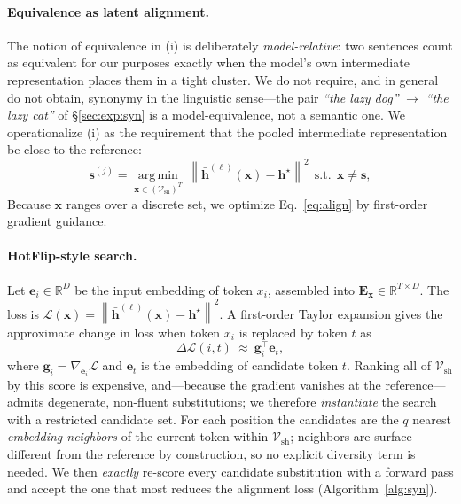 \documentclass[11pt]{article}
\newcommand{\R}{\mathbb{R}}
\newcommand{\Vsh}{\mathcal{V}_{\mathrm{sh}}}
\newcommand{\norm}[1]{\left\lVert #1 \right\rVert}
\newcommand{\argmin}{\operatorname*{arg\,min}}
\theoremstyle{definition}
\begin{document}
\paragraph{Equivalence as latent alignment.}
The notion of equivalence in (i) is deliberately \emph{model-relative}: two
sentences count as equivalent for our purposes exactly when the model's own
intermediate representation places them in a tight cluster. We do not require,
and in general do not obtain, synonymy in the linguistic sense---the pair
\emph{``the lazy dog''} $\to$ \emph{``the lazy cat''} of \S\ref{sec:exp:syn}
is a model-equivalence, not a semantic one. We operationalize (i) as the
requirement that the pooled intermediate representation be close to the
reference:
\begin{equation}
  \bm{s}^{(j)} = \argmin_{\bm{x} \in (\Vsh)^T}
  \ \norm{\bar{\bm{h}}^{(\ell)}(\bm{x}) - \bm{h}^\star}^2
  \ \ \text{s.t.}\ \ \bm{x} \ne \bm{s},
  \label{eq:align}
\end{equation}
Because $\bm{x}$ ranges over a discrete set, we optimize
Eq.~\eqref{eq:align} by first-order gradient guidance.

\paragraph{HotFlip-style search.}
Let $\bm{e}_i \in \R^D$ be the input embedding of token $x_i$, assembled into
$\bm{E}_{\bm{x}} \in \R^{T \times D}$. The loss is
$\mathcal{L}(\bm{x}) = \norm{\bar{\bm{h}}^{(\ell)}(\bm{x}) - \bm{h}^\star}^2$.
A first-order Taylor expansion gives the approximate change in loss when token
$x_i$ is replaced by token $t$ as
\begin{equation}
  \Delta \mathcal{L}(i, t) \ \approx\ \bm{g}_i^\top \bm{e}_t,
  \label{eq:hotflip}
\end{equation}
where $\bm{g}_i = \nabla_{\bm{e}_i} \mathcal{L}$ and $\bm{e}_t$ is the
embedding of candidate token $t$. Ranking all of $\Vsh$ by this score is
expensive, and---because the gradient vanishes at the reference---admits
degenerate, non-fluent substitutions; we therefore \emph{instantiate} the search
with a restricted candidate set. For each position the candidates are the $q$
nearest \emph{embedding neighbors} of the current token within $\Vsh$; neighbors
are surface-different from the reference by construction, so no explicit
diversity term is needed. We then \emph{exactly} re-score every candidate
substitution with a forward pass and accept the one that most reduces the
alignment loss (Algorithm~\ref{alg:syn}).
\end{document}
